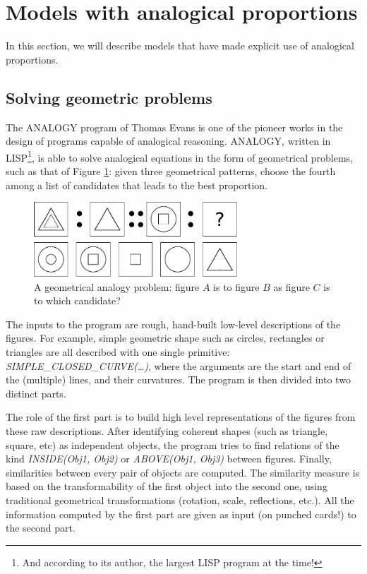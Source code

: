 \section{Models with analogical proportions}
\label{SEC:models_with_analogical_proportions}

In this section, we will describe models that have made explicit use of
analogical proportions.

\subsection{Solving geometric problems}

The ANALOGY program of Thomas Evans \cite{Eva64} is one of the pioneer works in
the design of programs capable of analogical reasoning. ANALOGY, written in
LISP\footnote{And according to its author, the largest LISP program at the
time!}, is able to solve analogical equations in the form of geometrical
problems, such as that of Figure \ref{FIG:evans}: given three geometrical
patterns, choose the fourth among a list of candidates that leads to the best
proportion.

\begin{figure}[!h]
\centering
\includegraphics[width=3in]{figures/evans.pdf}
\caption{A geometrical analogy problem: figure $A$ is to figure $B$ as figure
  $C$ is to which candidate?}
\label{FIG:evans}
\end{figure}

The inputs to the program are rough, hand-built low-level descriptions of the
figures. For example, simple geometric shape such as circles, rectangles or
triangles are all described with one single primitive:
\textit{SIMPLE\_CLOSED\_CURVE(\dots)}, where the arguments are the start and
end of the (multiple) lines, and their curvatures. The program is then
divided into two distinct parts.

The role of the first part is to build high level representations of the
figures from these raw descriptions. After identifying coherent shapes (such as
triangle, square, etc) as independent objects, the program tries to find
relations of the kind \textit{INSIDE(Obj1, Obj2)} or \textit{ABOVE(Obj1, Obj3)}
between figures. Finally, similarities between every pair of objects are
computed. The similarity measure is based on the transformability of the first
object into the second one, using traditional geometrical transformations
(rotation, scale, reflections, etc.). All the information computed by the first
part are given as input (on punched cards!) to the second part.

